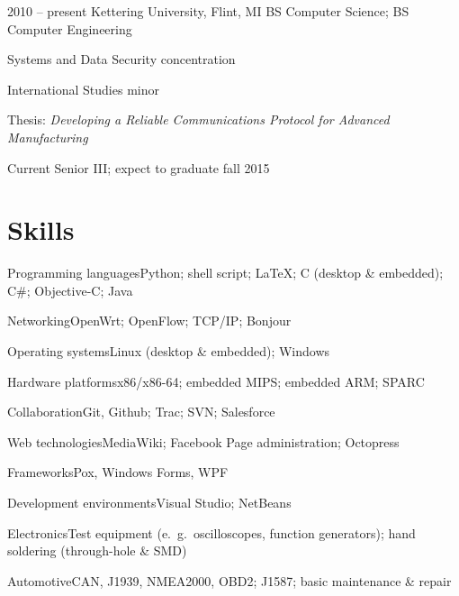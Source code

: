 \documentclass[12pt]{actccv/actccv}
\begin{document}
\begin{eventlist}

\item{2010 -- present}
     {Kettering University, Flint, MI}
     {BS Computer Science; BS Computer Engineering}
     
     Systems and Data Security concentration
      
     International Studies minor
     
     Thesis: \emph{Developing a Reliable Communications Protocol for Advanced Manufacturing}
     
     Current Senior III; expect to graduate fall 2015

\end{eventlist}

\section{Skills}

\begin{factlist}

\item{Programming languages}{Python; shell script; \LaTeX{}; C (desktop \& embedded); C\#; Objective-C; Java}
\item{Networking}{OpenWrt; OpenFlow; TCP/IP; Bonjour}
\item{Operating systems}{Linux (desktop \& embedded); Windows}
\item{Hardware platforms}{x86/x86-64; embedded MIPS; embedded ARM; SPARC}
\item{Collaboration}{Git, Github; Trac; SVN; Salesforce}
\item{Web technologies}{MediaWiki; Facebook Page administration; Octopress}
\item{Frameworks}{Pox, Windows Forms, WPF}
\item{Development environments}{Visual Studio; NetBeans}
\item{Electronics}{Test equipment (e.\ g.\ oscilloscopes, function generators); hand soldering (through-hole \& SMD)}
\item{Automotive}{CAN, J1939, NMEA2000, OBD2; J1587; basic maintenance \& repair}

\end{factlist}
\end{document}
